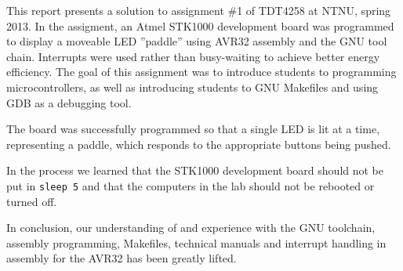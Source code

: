This report presents a solution to assignment \#1 of TDT4258 at NTNU, spring 2013.
In the assigment, an Atmel STK1000 development board was programmed to display a moveable LED ''paddle'' using AVR32 assembly and the GNU tool chain.
Interrupts were used rather than busy-waiting to achieve better energy efficiency.
The goal of this assignment was to introduce students to programming microcontrollers, as well as introducing students to GNU Makefiles and using GDB as a debugging tool.

The board was successfully programmed so that a single LED is lit at a time, representing a paddle, which responds to the appropriate buttons being pushed.

In the process we learned that the STK1000 development board should not be put in \texttt{sleep 5} and that the computers in the lab should not be rebooted or turned off.

In conclusion, our understanding of and experience with the GNU toolchain, assembly programming, Makefiles, technical manuals and interrupt handling in assembly for the AVR32 has been greatly lifted.
